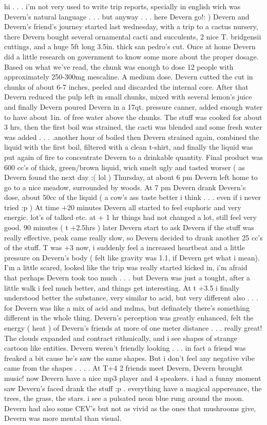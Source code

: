 \documentclass[12pt]{book}
\begin{document}
hi . . .  i'm not very used to write trip reports, specially in english wich was Devern's natural language . . .  but anyway . . .  here Devern go!: ) Devern and Devern's friend's journey started last wednesday, with a trip to a cactus nursery, there Devern bought several ornamental cacti and succulents, 2 nice T. bridgensii cuttings, and a huge 5ft long 3.5in. thick san pedro's cut. Once at home Devern did a little research on government to know some more about the proper dosage. Based on what we've read, the chunk was enough to dose 12 people with approximately 250-300mg mescaline. A medium dose. Devern cutted the cut in chunks of about 6-7 inches, peeled and discarded the internal core. After that Devern reduced the pulp left in small chunks, mixed with several lemon's juice and finally Devern poured Devern in a 17qt. pressure canner, added enough water to have about 1in. of free water above the chunks. The stuff was cooked for about 3 hrs, then the first boil was strained, the cacti was blended and some fresh water was added . . .  .another hour of boiled then Devern strained again, combined the liquid with the first boil, filtered with a clean t-shirt, and finally the liquid was put again of fire to concentrate Devern to a drinkable quantity. Final product was 600 cc's of thick, green/brown liquid, wich smelt ugly and tasted worser ( as Devern found the next day :( lol  ) Thursday, at about 6 pm Devern left home to go to a nice meadow, surrounded by woods. At 7 pm Devern drank Devern's dose, about 50cc of the liquid ( a cow's ass taste better i think . . .  even if i never tried :p  ) At time +20 minutes Devern all started to feel euphoric and very energic. lot's of talked etc. at + 1 hr things had not changed a lot, still feel very good. 90 minutes ( t +2.5hrs ) later Devern start to ask Devern if the stuff was really effective, peak came really slow, so Devern decided to drank another 25 cc's of the stuff. T was +3 now, i suddenly feel a increased heartbeat and a little pressure on Devern's body ( felt like gravity was 1.1, if Devern get what i mean). I'm a little scared, looked like the trip was really started kicked in, i'm afraid that perhaps Devern took too much . . .  but Devern was just a tought, after a little walk i feel much better, and things get interesting. At t +3.5 i finally understood better the substance, very similar to acid, but very different also . . .  for Devern was like a mix of acid and mdma, but definately there's something different in the whole thing. Devern's perception was greatly enhanced, felt the energy ( heat ) of Devern's friends at more of one meter distance . . .  really great! The clouds expanded and contract rithmically, and i see shapes of strange cartoon like entities. Devern weren't friendly looking . . .  in fact a friend was freaked a bit cause he's saw the same shapes. But i don't feel any negative vibe came from the shapes . . .  . At T+4 2 friends meet Devern, Devern brought music! now Devern have a nice mp3 player and 4 speakers. i had a funny moment saw Devern's faced drank the stuff :p . everything have a magical appereance, the trees, the grass, the stars. i see a pulsated neon blue rung around the moon. Devern had also some CEV's but not as vivid as the ones that mushrooms give, Devern was more mental than visual. 
\end{document}

